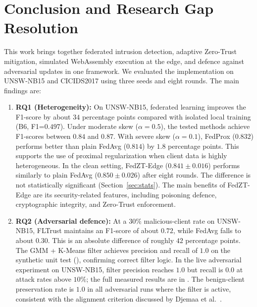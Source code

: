 \documentclass[11pt,a4paper]{article}
\newcommand{\bigsection}[1]{\FloatBarrier\Needspace*{0.22\textheight}\section{#1}}
\begin{document}
\bigsection{Conclusion and Research Gap Resolution}\label{sec:conclusion}

This work brings together federated intrusion detection, adaptive Zero-Trust mitigation, simulated WebAssembly execution at the edge, and defence against adversarial updates in one framework. We evaluated the implementation on UNSW-NB15 and CICIDS2017 using three seeds and eight rounds. The main findings are:
\begin{enumerate}[leftmargin=1.8em,itemsep=1pt]
    \item \textbf{RQ1 (Heterogeneity):} On UNSW-NB15, federated learning improves the F1-score by about $34$ percentage points compared with isolated local training (B6, F1=$0.497$). Under moderate skew ($\alpha=0.5$), the tested methods achieve F1-scores between $0.84$ and $0.87$. With severe skew ($\alpha=0.1$), FedProx ($0.832$) performs better than plain FedAvg ($0.814$) by $1.8$ percentage points. This supports the use of proximal regularization when client data is highly heterogeneous. In the clean setting, FedZT-Edge ($0.841 \pm 0.016$) performs similarly to plain FedAvg ($0.850 \pm 0.026$) after eight rounds. The difference is not statistically significant (Section~\ref{sec:stats}). The main benefits of FedZT-Edge are its security-related features, including poisoning defence, cryptographic integrity, and Zero-Trust enforcement.

    \item \textbf{RQ2 (Adversarial defence):} At a $30\%$ malicious-client rate on UNSW-NB15, FLTrust maintains an F1-score of about $0.72$, while FedAvg falls to about $0.30$. This is an absolute difference of roughly $42$ percentage points. The GMM + K-Means filter achieves precision and recall of $1.0$ on the synthetic unit test (), confirming correct filter logic. In the live adversarial experiment on UNSW-NB15, filter precision reaches $1.0$ but recall is $0.0$ at attack rates above $10\%$; the full measured results are in . The benign-client preservation rate is $1.0$ in all adversarial runs where the filter is active, consistent with the alignment criterion discussed by Djemaa et al.~\cite{djemaa2026}.


\end{enumerate}
\end{document}
